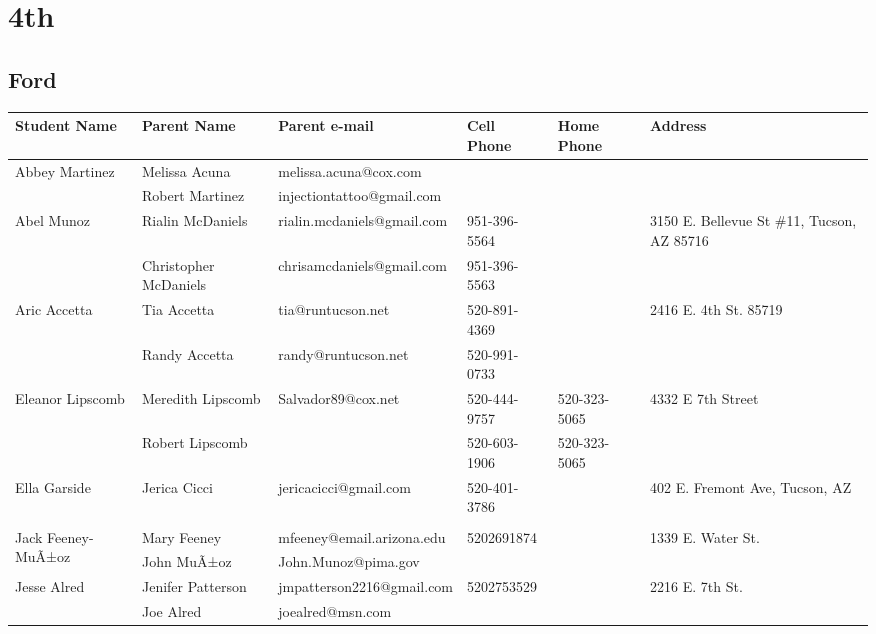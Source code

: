\documentclass[landscape]{article}\usepackage[]{graphicx}\usepackage[]{color}
\begin{document}
\section{4th}
\subsection{Ford}
\begin{longtable}{|p{100pt}|p{100pt}|p{140pt}|p{60pt}|p{64pt}|p{120pt}|}
\textbf{Student Name} & \textbf{Parent Name} & \textbf{Parent e-mail} & \textbf{Cell Phone} & \textbf{Home Phone} & \textbf{Address}\\
\hline
\hline
\multirow{2}{100pt}{Abbey Martinez} & Melissa Acuna & melissa.acuna@cox.com &  &  & \multirow{2}{120pt}{} \\
 & Robert Martinez & injectiontattoo@gmail.com &  &  & \\
\hline
\multirow{2}{100pt}{Abel Munoz} & Rialin McDaniels & rialin.mcdaniels@gmail.com & 951-396-5564 &  & \multirow{2}{120pt}{3150 E. Bellevue St \#11, Tucson, AZ 85716} \\
 & Christopher McDaniels & chrisamcdaniels@gmail.com & 951-396-5563 &  & \\
\hline
\multirow{2}{100pt}{Aric Accetta} & Tia Accetta & tia@runtucson.net & 520-891-4369 &  & \multirow{2}{120pt}{2416 E. 4th St. 85719} \\
 & Randy Accetta & randy@runtucson.net & 520-991-0733 &  & \\
\hline
\multirow{2}{100pt}{Eleanor Lipscomb} & Meredith Lipscomb & Salvador89@cox.net & 520-444-9757 & 520-323-5065 & \multirow{2}{120pt}{4332 E 7th Street} \\
 & Robert Lipscomb &  & 520-603-1906 & 520-323-5065 & \\
\hline
\multirow{2}{100pt}{Ella Garside} & Jerica Cicci & jericacicci@gmail.com & 520-401-3786 &  & \multirow{2}{120pt}{402 E. Fremont Ave, Tucson, AZ } \\
 &  &  &  &  & \\
\hline
\multirow{2}{100pt}{Jack Feeney-MuÃ±oz} & Mary Feeney & mfeeney@email.arizona.edu & 5202691874 &  & \multirow{2}{120pt}{1339 E. Water St.} \\
 & John MuÃ±oz & John.Munoz@pima.gov &  &  & \\
\hline
\multirow{2}{100pt}{Jesse Alred} & Jenifer Patterson & jmpatterson2216@gmail.com & 5202753529 &  & \multirow{2}{120pt}{2216 E. 7th St.} \\
 & Joe Alred & joealred@msn.com &  &  & \\

\end{longtable}
\end{document}
